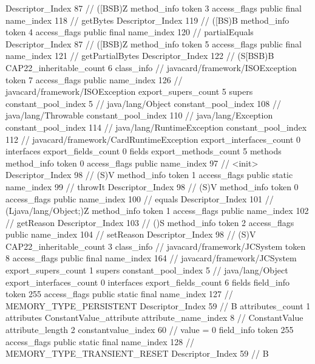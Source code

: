 {{{{{					Descriptor_Index	87		// ([BSB)Z
				}
				method_info {
					token	3
					access_flags	public final
					name_index	118		// getBytes
					Descriptor_Index	119		// ([BS)B
				}
				method_info {
					token	4
					access_flags	public final
					name_index	120		// partialEquals
					Descriptor_Index	87		// ([BSB)Z
				}
				method_info {
					token	5
					access_flags	public final
					name_index	121		// getPartialBytes
					Descriptor_Index	122		// (S[BSB)B
				}
			}
			CAP22_inheritable_count	6
		}
		class_info {		// javacard/framework/ISOException
			token	7
			access_flags	public
			name_index	126		// javacard/framework/ISOException
			export_supers_count	5
			supers {
				constant_pool_index	5		// java/lang/Object
				constant_pool_index	108		// java/lang/Throwable
				constant_pool_index	110		// java/lang/Exception
				constant_pool_index	114		// java/lang/RuntimeException
				constant_pool_index	112		// javacard/framework/CardRuntimeException
			}
			export_interfaces_count	0
			interfaces {
			}
			export_fields_count	0
			fields {
			}
			export_methods_count	5
			methods {
				method_info {
					token	0
					access_flags	public
					name_index	97		// <init>
					Descriptor_Index	98		// (S)V
				}
				method_info {
					token	1
					access_flags	public static
					name_index	99		// throwIt
					Descriptor_Index	98		// (S)V
				}
				method_info {
					token	0
					access_flags	public
					name_index	100		// equals
					Descriptor_Index	101		// (Ljava/lang/Object;)Z
				}
				method_info {
					token	1
					access_flags	public
					name_index	102		// getReason
					Descriptor_Index	103		// ()S
				}
				method_info {
					token	2
					access_flags	public
					name_index	104		// setReason
					Descriptor_Index	98		// (S)V
				}
			}
			CAP22_inheritable_count	3
		}
		class_info {		// javacard/framework/JCSystem
			token	8
			access_flags	public final
			name_index	164		// javacard/framework/JCSystem
			export_supers_count	1
			supers {
				constant_pool_index	5		// java/lang/Object
			}
			export_interfaces_count	0
			interfaces {
			}
			export_fields_count	6
			fields {
			field_info {
				token	255
				access_flags	public static final
				name_index	127		// MEMORY_TYPE_PERSISTENT
				Descriptor_Index	59		// B
				attributes_count	1
				attributes {
				ConstantValue_attribute {
					attribute_name_index	8		// ConstantValue
					attribute_length	2
					constantvalue_index	60		// value = 0
				}
				}
			}
			field_info {
				token	255
				access_flags	public static final
				name_index	128		// MEMORY_TYPE_TRANSIENT_RESET
				Descriptor_Index	59		// B
}}}}}
